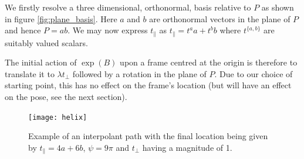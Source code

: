 We firstly resolve a three dimensional, orthonormal, basis relative to $P$ as shown in figure 
\ref{fig:plane_basis}. Here $a$ and $b$ are orthonormal vectors in the plane of $P$ and hence
$P = ab$. We may now express $t_\parallel$ as $t_\parallel = t^a a + t^b b$ where $t^{\{a,b\}}$ are suitably
valued scalars.

The initial action of $\exp(B)$ upon a frame centred at the origin is therefore to 
translate it to $\lambda t_\perp$ followed by a rotation in the plane of $P$. Due to our choice of starting
point, this has no effect on the frame's location (but will have an effect on the pose, 
see the next section).


\begin{figure}\centering
\texttt{[image: helix]}
\caption{\label{fig:helix} Example of an interpolant path with the final location being given by
$t_\parallel = 4a + 6b$, $\psi = 9\pi$ and $t_\perp$ having a magnitude of 1.}
\end{figure}

